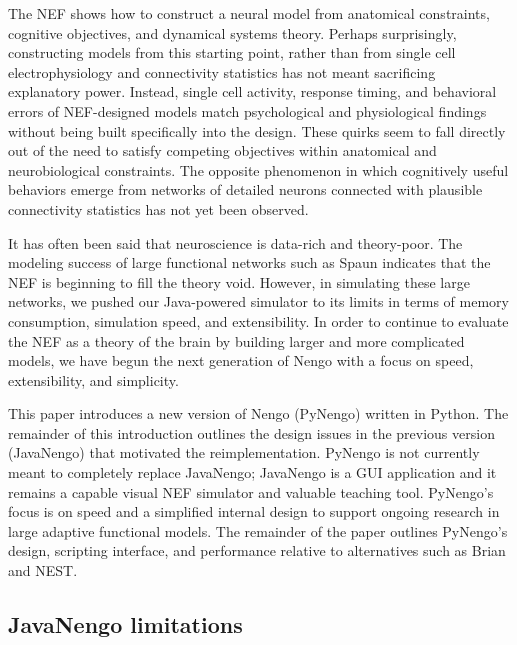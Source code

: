 \documentclass{frontiersSCNS}
\begin{document}
The NEF shows how to
construct a neural model
from anatomical constraints,
cognitive objectives, and
dynamical systems theory.
Perhaps surprisingly,
constructing models from this starting point,
rather than from single cell electrophysiology
and connectivity statistics
has not meant sacrificing
explanatory power.
Instead, single cell activity,
response timing, and behavioral errors
of NEF-designed models match
psychological and physiological findings
without being built specifically into the design.
These quirks seem to fall directly out
of the need to satisfy competing objectives
within anatomical and neurobiological constraints.
The opposite phenomenon in which
cognitively useful behaviors emerge
from networks of detailed neurons
connected with plausible connectivity statistics
has not yet been observed.

It has often been said that neuroscience
is data-rich and theory-poor.
The modeling success of
large functional networks such as Spaun
indicates that the NEF
is beginning to fill the theory void.
However, in simulating these large networks,
we pushed our Java-powered simulator
to its limits in terms of memory consumption,
simulation speed, and extensibility.
In order to continue to evaluate the NEF
as a theory of the brain
by building larger and more complicated models,
we have begun the next generation
of Nengo with a focus on speed,
extensibility, and simplicity.

This paper introduces a new version
of Nengo (PyNengo) written in Python.
The remainder of this introduction outlines
the design issues in the previous version (JavaNengo)
that motivated the reimplementation.
PyNengo is not currently meant
to completely replace JavaNengo;
JavaNengo is a GUI application
and it remains a capable visual NEF
simulator and valuable teaching tool.
PyNengo's focus is on speed
and a simplified internal design
to support ongoing research in
large adaptive functional models.
The remainder of the paper outlines PyNengo's design,
scripting interface, and performance relative to
alternatives such as Brian and NEST.

\subsection{JavaNengo limitations}
\end{document}
